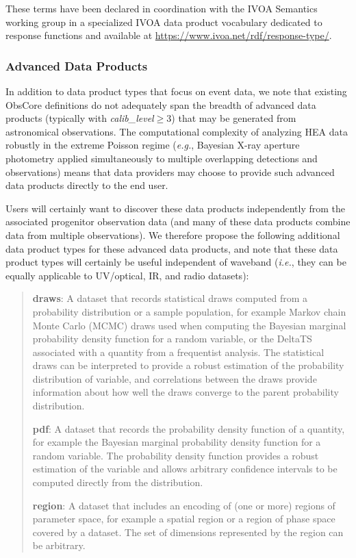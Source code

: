 \documentclass[11pt,a4paper]{ivoa}
\begin{document}
These terms have been declared in coordination with the IVOA Semantics working group in a specialized IVOA data product vocabulary dedicated to response functions and available at \url{https://www.ivoa.net/rdf/response-type/}.

\subsubsection{Advanced Data Products}

In addition to data product types that focus on event data, we note that existing ObsCore definitions do not adequately span the breadth of advanced data products (typically with {\em calib\_level\/}${}\ge 3$) that may be generated from astronomical observations. The computational complexity of analyzing \gls{HEA} data robustly in the extreme Poisson regime ({\em e.g.\/}, Bayesian X-ray aperture photometry applied simultaneously to multiple overlapping detections and observations) means that data providers may choose to provide such advanced data products directly to the end user.

Users will certainly want to discover these data products independently from the associated progenitor observation data (and many of these data products combine data from multiple observations). We therefore propose the following additional data product types for these advanced data products, and note that these data product types will certainly be useful independent of waveband ({\em i.e.\/}, they can be equally applicable to UV/optical, IR, and radio datasets):

\begin{quote}
  {\bf draws}:  A dataset that records statistical draws computed from a probability distribution or a sample population, for example Markov chain Monte Carlo (MCMC) draws used when computing the Bayesian marginal probability density function for a random variable, or the DeltaTS associated with a quantity from a frequentist analysis.  The statistical draws can be interpreted to provide a robust estimation of the probability distribution of variable, and correlations between the draws provide information about how well the draws converge to the parent probability distribution.

{\bf pdf}: A dataset that records the probability density function of a quantity, for example the Bayesian marginal probability density function for a random variable.  The probability density function provides a robust estimation of the variable and allows arbitrary confidence intervals to be computed directly from the distribution.

{\bf region}: A dataset that includes an encoding of (one or more) regions of parameter space, for example a spatial region or a region of phase space covered by a dataset.  The set of dimensions represented by the region can be arbitrary.
\end{quote}
\end{document}
